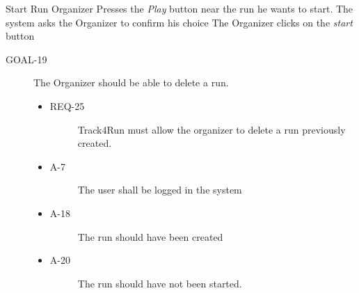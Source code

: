 \documentclass[a4paper]{article}
\newcommand{\requirement}{\ding{229}}%
\begin{document}
        
        \begin{usecase}{Start Run}
              {Organizer Presses the \textit{Play} button near the run he wants to start.}
              {The system asks the Organizer to confirm his choice}
              {The Organizer clicks on the \textit{start} button}
        \end{usecase}
        
        \begin{description}
        	\item[GOAL-19] The Organizer should be able to delete a run.
            	\begin{itemize}
            	    \item[\requirement]
                	\begin{description}
                	\item[REQ-25] Track4Run must allow the organizer to delete a run previously created.
                	\end{description}
                	\item
                	\begin{description}
                	\item[A-7] The user shall be logged in the system         \end{description}
                	\item
                	\begin{description}
                	\item[A-18] The run should have been created  
                	\end{description}
                	\item
                	\begin{description}
                	\item[A-20] The run should have not been started.
                	\end{description}
                	\end{itemize}
        \end{description}
        
\end{document}
